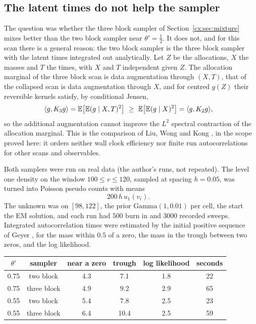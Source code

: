\subsection{The latent times do not help the sampler}\label{cx:sec:latent}

The question was whether the three block sampler of Section~\ref{cx:sec:mixture} mixes better than the two block sampler near $\theta'=\tfrac12$. It does not, and for this scan there is a general reason: the two block sampler is the three block sampler with the latent times integrated out analytically. Let $Z$ be the allocations, $X$ the masses and $T$ the times, with $X$ and $T$ independent given $Z$. The allocation marginal of the three block scan is data augmentation through $(X,T)$, that of the collapsed scan is data augmentation through $X$, and for centred $g(Z)$ their reversible kernels satisfy, by conditional Jensen,
\[
\langle g,K_3g\rangle=\mathbb{E}\bigl[\mathbb{E}(g\mid X,T)^2\bigr]\ \ge\ \mathbb{E}\bigl[\mathbb{E}(g\mid X)^2\bigr]=\langle g,K_2g\rangle ,
\]
so the additional augmentation cannot improve the $L^2$ spectral contraction of the allocation marginal. This is the comparison of Liu, Wong and Kong \cite{LiuWongKong94}, in the scope proved here: it orders neither wall clock efficiency nor finite run autocorrelations for other scans and observables.

Both samplers were run on real data (the author's runs, not repeated). The level one density on the window $100\le v\le120$, sampled at spacing $h=0.05$, was turned into Poisson pseudo counts with means
\[
200\,h\,u_1(v_i).
\]
The unknown was on $[98,122]$, the prior $\mathrm{Gamma}(1,0.01)$ per cell, the start the EM solution, and each run had $500$ burn in and $3000$ recorded sweeps. Integrated autocorrelation times were estimated by the initial positive sequence of Geyer \cite{Geyer92}, for the mass within $0.5$ of a zero, the mass in the trough between two zeros, and the log likelihood.

\begin{center}
\small
\begin{tabular}{cccccc}
\toprule
$\theta'$ & sampler & near a zero & trough & log likelihood & seconds\\
\midrule
0.75 & two block & 4.3 & 7.1 & 1.8 & 22\\
0.75 & three block & 4.9 & 9.2 & 2.9 & 65\\
0.55 & two block & 5.4 & 7.8 & 2.5 & 23\\
0.55 & three block & 6.4 & 10.4 & 2.5 & 59\\
\bottomrule
\end{tabular}
\end{center}

